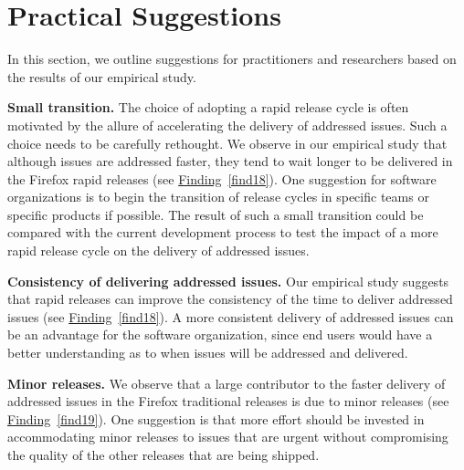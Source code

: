 \section{Practical Suggestions} \label{sec:guidelines}

In this section, we outline suggestions for practitioners and researchers based
on the results of our empirical study.

\begin{description}
	\item \textbf{Small transition.} The choice of adopting a rapid release
		cycle is often motivated by the allure of
		accelerating the delivery of addressed issues. Such a choice needs to be
		carefully rethought. We observe in our empirical study that
		although issues are addressed faster, they tend to wait longer
		to be delivered in the Firefox rapid releases (see
		\hyperref[find18]{Finding}~\ref{find18}). One
		suggestion for software organizations is to begin the transition
		of release cycles in specific teams or specific products if
		possible. The result of such a small transition could be
		compared with the current development process to test the impact
		of a more rapid release cycle on the
		delivery of addressed issues. \\ 
	\item \textbf{Consistency of delivering addressed issues.} Our empirical
		study suggests that rapid releases can improve the consistency
		of the time to deliver addressed issues (see
		\hyperref[find18]{Finding}~\ref{find18}). A more consistent
		delivery of addressed issues can be an advantage for the
		software organization, since end users would have a better
		understanding as to when issues will be addressed and delivered. \\
	\item \textbf{Minor releases.} We observe that a large contributor to
		the faster delivery of addressed issues in the Firefox
		traditional releases is due to minor releases (see
		\hyperref[find19]{Finding}~\ref{find19}). One
		suggestion is that more effort should be invested in
		accommodating minor releases to issues that are urgent without
		compromising the quality of the other releases that are being shipped. \\
\end{description}

